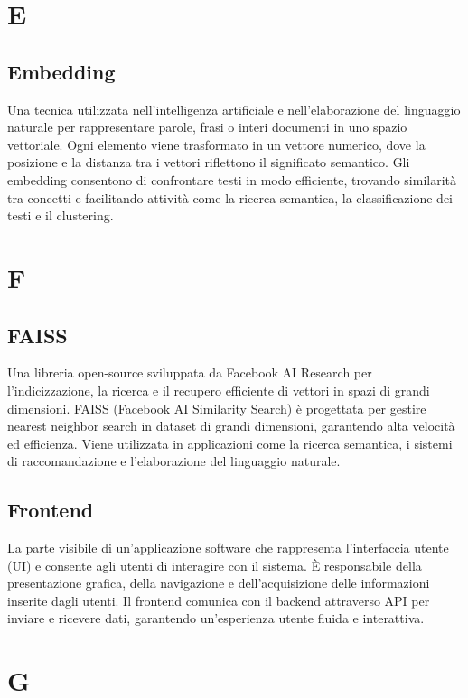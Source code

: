 \documentclass{article}
\begin{document}
\newpage
\section{E}
\subsection{Embedding}
Una tecnica utilizzata nell'intelligenza artificiale e nell'elaborazione del linguaggio naturale per rappresentare parole, frasi o interi documenti in uno spazio vettoriale. Ogni elemento viene trasformato in un vettore numerico, dove la posizione e la distanza tra i vettori riflettono il significato semantico. Gli embedding consentono di confrontare testi in modo efficiente, trovando similarità tra concetti e facilitando attività come la ricerca semantica, la classificazione dei testi e il clustering.

\newpage
\section{F}

\subsection{FAISS}
Una libreria open-source sviluppata da Facebook AI Research per l'indicizzazione, la ricerca e il recupero efficiente di vettori in spazi di grandi dimensioni. FAISS (Facebook AI Similarity Search) è progettata per gestire nearest neighbor search in dataset di grandi dimensioni, garantendo alta velocità ed efficienza. Viene utilizzata in applicazioni come la ricerca semantica, i sistemi di raccomandazione e l'elaborazione del linguaggio naturale.

\subsection{Frontend}
La parte visibile di un'applicazione software che rappresenta l'interfaccia utente (UI) e consente agli utenti di interagire con il sistema. È responsabile della presentazione grafica, della navigazione e dell'acquisizione delle informazioni inserite dagli utenti. Il frontend comunica con il backend attraverso API per inviare e ricevere dati, garantendo un'esperienza utente fluida e interattiva.

\newpage
\section{G}
\end{document}
